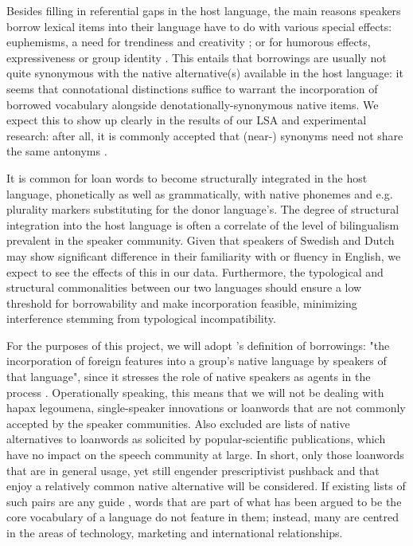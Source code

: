 \documentclass[a4paper]{article}
\begin{document}
Besides filling in referential gaps in the host language, the main reasons speakers borrow lexical items into their language have to do with various special effects: euphemisms, a need for trendiness and creativity \citep[cf.][]{Rebuck2002}; or for humorous effects, expressiveness or group identity \citep[cf.][]{Gottlieb2006,Wennberg2010}. This entails that borrowings are usually not quite synonymous with the native alternative(s) available in the host language: it seems that connotational distinctions suffice to warrant the incorporation of borrowed vocabulary alongside denotationally-synonymous native items. We expect this to show up clearly in the results of our LSA and experimental research: after all, it is commonly accepted that (near-) synonyms need not share the same antonyms \citep[cf.][]{Miller1990}. 

It is common for loan words to become structurally integrated in the host language, phonetically as well as grammatically, with native phonemes and e.g. plurality markers substituting for the donor language's.
The degree of structural integration into the host language is often a correlate of the level of bilingualism prevalent in the speaker community.
Given that speakers of Swedish and Dutch may show significant difference in their familiarity with or fluency in English, we expect to see the effects of this in our data.
Furthermore, the typological and structural commonalities between our two languages should ensure a low threshold for borrowability and make incorporation feasible, minimizing interference stemming from typological incompatibility.


For the purposes of this project, we will adopt \citet[p.37]{Thomason1988}'s definition of borrowings: "the incorporation of foreign features into a group's native language by speakers of that language", since it stresses the role of native speakers as agents in the process \citep[see also][p.12]{Winford2003}. Operationally speaking, this means that we will not be dealing with hapax legoumena, single-speaker innovations or loanwords that are not commonly accepted by the speaker communities. Also excluded are lists of native alternatives to loanwords as solicited by popular-scientific publications, which have no impact on the speech community at large. 
In short, only those loanwords that are in general usage, yet still engender prescriptivist pushback and that enjoy a relatively common native alternative will be considered. If existing lists of such pairs are any guide \citep[cf.][]{Koops2009,Universitet2012},
 words that are part of what has been argued to be the core vocabulary of a language \citep[see][]{Swadesh1952} do not feature in them; instead, many are centred in the areas of technology, marketing and international relationships. 
\end{document}
